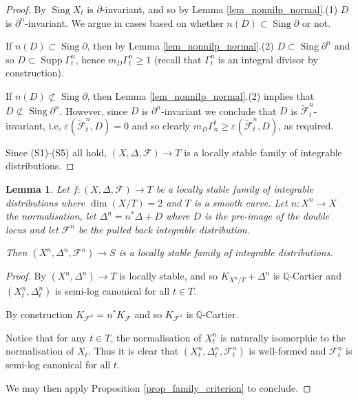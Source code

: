 \documentclass[12pt, a4paper]{amsart}
\DeclareMathOperator{\sing}{Sing}
\DeclareMathOperator{\supp}{Supp}
\newcounter{Theorem}
\newtheorem{lemma}[theorem]{Lemma}
\theoremstyle{definition}
\theoremstyle{named}
\begin{document}
\begin{proof}
By \cite[Theorem 5]{MR0212027} $\sing X_t$
is $\partial$-invariant, and so by Lemma \ref{lem_nonnilp_normal}.(1) $D$ is $\partial^n$-invariant.
We argue in cases based on whether 
$n(D) \subset \sing \partial$ or not.

If $n(D) \subset \sing \partial$, then by Lemma \ref{lem_nonnilp_normal}.(2) $D \subset \sing \partial^n$ and so $D \subset \supp \Gamma^n_t$, hence $m_D\Gamma^n_t \ge 1$ (recall that $\Gamma^n_t$ is an integral divisor by construction).  

If $n(D) \not\subset \sing \partial$, then Lemma \ref{lem_nonnilp_normal}.(2) implies that 
$D \not\subset \sing \partial^n$.  However, since $D$ is $\partial^n$-invariant we conclude that $D$ is $\tilde{\mathcal F}^n_t$-invariant, i.e, $\varepsilon(\tilde{\mathcal F}^n_t, D) = 0$
and so clearly $m_D\Gamma_n^t \ge \varepsilon(\tilde{\mathcal F}^n_t, D)$, as required.

Since (S1)-(S5) all hold,  $(X, \Delta, \mathcal F) \rightarrow T$ is a 
locally stable family of integrable distributions.
\end{proof}





\begin{lemma}
    \label{lem_norm_loc_stable}
    Let $f\colon (X, \Delta, \mathcal F) \rightarrow T$
    be a locally stable family of integrable distributions where $\dim (X/T) = 2$ and $T$ is a smooth curve.
    Let $n\colon X^n \rightarrow X$ the normalisation, 
    let $\Delta^n = n^*\Delta+D$ where $D$ is the pre-image of the double locus and
    let $\mathcal F^n$ be the pulled back integrable distribution.

    Then $(X^n, \Delta^n, \mathcal F^n) \rightarrow S$
    is a locally stable family of integrable distributions.
\end{lemma}
\begin{proof}
By \cite[Proposition 2.12]{modbook} $(X^n, \Delta^n) \rightarrow T$ is locally stable, and so $K_{X^n/T}+\Delta^n$ is $\mathbb Q$-Cartier and $(X^n_t, \Delta^n_t)$ is semi-log canonical for all $t \in T$.

By construction $K_{\mathcal F^n} = n^*K_{\mathcal F}$ and so $K_{\mathcal F^n}$ is $\mathbb Q$-Cartier.

Notice that for any $t \in T$, the normalisation of $X^n_t$ is naturally isomorphic to the normalisation of $X_t$.
Thus it is clear that $(X^n_t, \Delta^n_t, \mathcal F^n_t)$ is well-formed and $\mathcal F^n_t$ is semi-log canonical for all $t$.

We may then apply Proposition \ref{prop_family_criterion} to conclude.
\end{proof}
\end{document}
